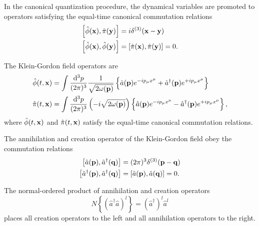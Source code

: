 \begin{definition}
	In the canonical quantization procedure, the dynamical variables are promoted to operators satisfying the equal-time canonical commutation relations
	\begin{align}
		\comm{\hat\phi(\vb{x})}{\hat\pi(\vb{y})}
		&=
		i\delta^{(3)}(\vb{x}-\vb{y})
		\\
		\comm{\hat\phi(\vb{x})}{\hat\phi(\vb{y})}
		&=
		\comm{\hat\pi(\vb{x})}{\hat\pi(\vb{y})}
		=
		0
		\label{eq:qkg_comm_pm}
		.
	\end{align}
\end{definition}
\begin{theorem}
	The Klein-Gordon field operators are
	\begin{align}
		\hat\phi(t,\vb{x})
		&=
		\int\frac{\dd[3]{p}}{(2\pi)^3}
		\frac{1}{\sqrt{2\omega(\vb{p})}}
		\left\{
			\hat{a}(\vb{p})
			e^{-ip_\mu x^\mu}
			+
			\hat{a}^\dagger(\vb{p})
			e^{+ip_\mu x^\mu}
		\right\}
		\label{eq:qkg_pos}
		\\
		\hat\pi(t,\vb{x})
		&=
		\int\frac{\dd[3]{p}}{(2\pi)^3}
		\left(-i\sqrt{2\omega(\vb{p})}\right)
		\left\{
			\hat{a}(\vb{p})
			e^{-ip_\mu x^\mu}
			-
			\hat{a}^\dagger(\vb{p})
			e^{+ip_\mu x^\mu}
		\right\}
		\label{eq:qkg_mom}
		,
	\end{align}
	where $\hat\phi(t,\vb{x})$ and $\hat\pi(t,\vb{x})$ satisfy the equal-time canonical commutation relations.
\end{theorem}
\begin{theorem}\label{thm:kg_comm_ac}
	The annihilation and creation operator of the Klein-Gordon field obey the commutation relations
	\begin{align}
		\comm{\hat{a}(\vb{p})}{\hat{a}^\dagger(\vb{q})}
		&=
		(2\pi)^3
		\delta^{(3)}(\vb{p}-\vb{q})
		\\
		\comm{\hat{a}^\dagger(\vb{p})}{\hat{a}^\dagger(\vb{q})}
		&=
		\comm{\hat{a}(\vb{p})}{\hat{a}(\vb{q})}
		=
		0
		\label{eq:kg_comm_ac}
		.
	\end{align}	
\end{theorem}
\begin{definition}
	The normal-ordered product of annihilation and creation operators
	\begin{equation}
		N\left\{
			\left(
				\hat{a}^\dagger
				\hat{a}
			\right)^l
		\right\}
		=
		\left(\hat{a}^\dagger\right)^l
		\hat{a}^l
	\end{equation}
	places all creation operators to the left and all annihilation operators to the right.
\end{definition}
